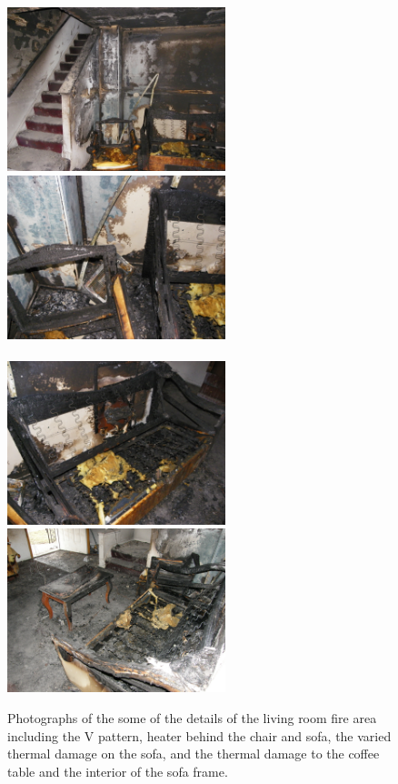 \documentclass[twoside]{uocthesis}
\begin{document}
{\begin{figure}[ht!]
	\centering
		\includegraphics[width=2.5in]{../Figures/V_pattern}
		\includegraphics[width=2.5in]{../Figures/Heater}\\
		\hspace{3 mm}  \\
		\includegraphics[width=2.5in]{../Figures/Sofa}
		\includegraphics[width=2.5in]{../Figures/Table}\\
	\caption[Photographs of the some of the details of the living room fire area]{Photographs of the some of the details of the living room fire area including the V pattern, heater behind the chair and sofa, the varied thermal damage on the sofa, and the thermal damage to the coffee table and the interior of the sofa frame.}
	\label{EXT_LRDetails}
\end{figure}

}
\end{document}
